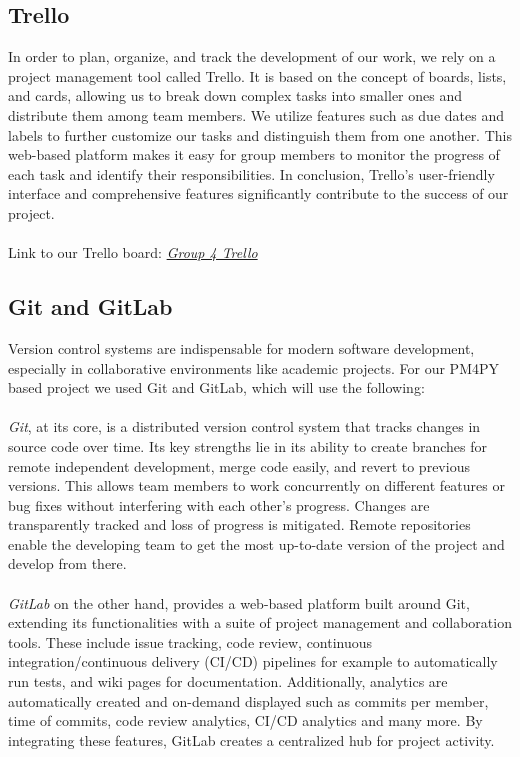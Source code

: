 \documentclass[12pt,a4paper]{article}
\begin{document}
\subsection{Trello}
In order to plan, organize, and track the development of our work, we rely on a project management tool called Trello. It is based on the concept of boards, lists, and cards, allowing us to break down complex tasks into smaller ones and distribute them among team members. We utilize features such as due dates and labels to further customize our tasks and distinguish them from one another. This web-based platform makes it easy for group members to monitor the progress of each task and identify their responsibilities. In conclusion, Trello's user-friendly interface and comprehensive features significantly contribute to the success of our project.
\\\\
Link to our Trello board: \href{https://trello.com/invite/b/69e7795b0301156f7b398049/ATTI312fa2edbd35f19912efe97f4c4d0d8bCA988E2A/conformance-predictions}{\textit{Group 4 Trello}}

\subsection{Git and GitLab}
Version control systems are indispensable for modern software development, especially in collaborative environments like academic projects. For our PM4PY based project we used Git and GitLab, which will use the following: \\
\\
\textit{Git}, at its core, is a distributed version control system that tracks changes in source code over time. Its key strengths lie in its ability to create branches for remote independent development, merge code easily, and revert to previous versions. This allows team members to work concurrently on different features or bug fixes without interfering with each other's progress. Changes are transparently tracked and loss of progress is mitigated. Remote repositories enable the developing team to get the most up-to-date version of the project and develop from there. \\
\\
\textit{GitLab} on the other hand, provides a web-based platform built around Git, extending its functionalities with a suite of project management and collaboration tools. These include issue tracking, code review, continuous integration/continuous delivery (CI/CD) pipelines for example to automatically run tests, and wiki pages for documentation. Additionally, analytics are automatically created and on-demand displayed such as commits per member, time of commits, code review analytics, CI/CD analytics and many more. By integrating these features, GitLab creates a centralized hub for project activity.
\\\\
\end{document}
